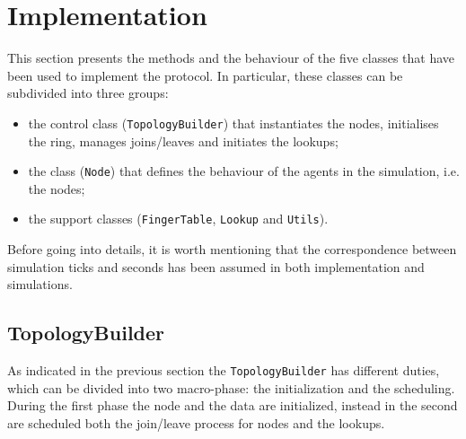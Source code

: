 \documentclass[11pt,twocolumn,letterpaper]{article}
\begin{document}
	\section{Implementation}
	\label{sec:implementation}
	This section presents the methods and the behaviour of the five classes that have been used to implement the protocol. In particular, these classes can be subdivided into three groups:
	\begin{itemize}
		\item the control class (\texttt{TopologyBuilder}) that instantiates the nodes, initialises the ring, manages joins/leaves and initiates the lookups;
		\item the class (\texttt{Node}) that defines the behaviour of the agents in the simulation, i.e. the nodes;
		\item the support classes (\texttt{FingerTable}, \texttt{Lookup} and \texttt{Utils}).
	\end{itemize}
	Before going into details, it is worth mentioning that the correspondence between simulation ticks and seconds has been assumed in both implementation and simulations. 

	\subsection{TopologyBuilder}
	\label{subsec:topbuilder}
	As indicated in the previous section the \texttt{TopologyBuilder} has different duties, which can be divided into two macro-phase: the initialization and the scheduling. During the first phase the node and the data are initialized, instead in the second are scheduled both the join/leave process for nodes and the lookups.
	 
\end{document}
